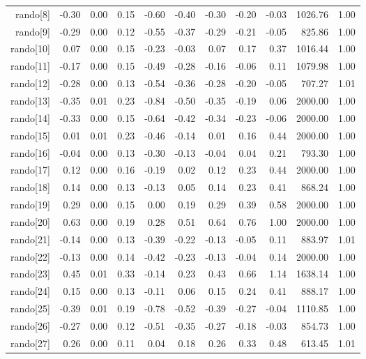 \begin{table}[ht]
\begin{tabular}{rrrrrrrrrrr}
  rando[8] & -0.30 & 0.00 & 0.15 & -0.60 & -0.40 & -0.30 & -0.20 & -0.03 & 1026.76 & 1.00 \\ 
  rando[9] & -0.29 & 0.00 & 0.12 & -0.55 & -0.37 & -0.29 & -0.21 & -0.05 & 825.86 & 1.00 \\ 
  rando[10] & 0.07 & 0.00 & 0.15 & -0.23 & -0.03 & 0.07 & 0.17 & 0.37 & 1016.44 & 1.00 \\ 
  rando[11] & -0.17 & 0.00 & 0.15 & -0.49 & -0.28 & -0.16 & -0.06 & 0.11 & 1079.98 & 1.00 \\ 
  rando[12] & -0.28 & 0.00 & 0.13 & -0.54 & -0.36 & -0.28 & -0.20 & -0.05 & 707.27 & 1.01 \\ 
  rando[13] & -0.35 & 0.01 & 0.23 & -0.84 & -0.50 & -0.35 & -0.19 & 0.06 & 2000.00 & 1.00 \\ 
  rando[14] & -0.33 & 0.00 & 0.15 & -0.64 & -0.42 & -0.34 & -0.23 & -0.06 & 2000.00 & 1.00 \\ 
  rando[15] & 0.01 & 0.01 & 0.23 & -0.46 & -0.14 & 0.01 & 0.16 & 0.44 & 2000.00 & 1.00 \\ 
  rando[16] & -0.04 & 0.00 & 0.13 & -0.30 & -0.13 & -0.04 & 0.04 & 0.21 & 793.30 & 1.00 \\ 
  rando[17] & 0.12 & 0.00 & 0.16 & -0.19 & 0.02 & 0.12 & 0.23 & 0.44 & 2000.00 & 1.00 \\ 
  rando[18] & 0.14 & 0.00 & 0.13 & -0.13 & 0.05 & 0.14 & 0.23 & 0.41 & 868.24 & 1.00 \\ 
  rando[19] & 0.29 & 0.00 & 0.15 & 0.00 & 0.19 & 0.29 & 0.39 & 0.58 & 2000.00 & 1.00 \\ 
  rando[20] & 0.63 & 0.00 & 0.19 & 0.28 & 0.51 & 0.64 & 0.76 & 1.00 & 2000.00 & 1.00 \\ 
  rando[21] & -0.14 & 0.00 & 0.13 & -0.39 & -0.22 & -0.13 & -0.05 & 0.11 & 883.97 & 1.01 \\ 
  rando[22] & -0.13 & 0.00 & 0.14 & -0.42 & -0.23 & -0.13 & -0.04 & 0.14 & 2000.00 & 1.00 \\ 
  rando[23] & 0.45 & 0.01 & 0.33 & -0.14 & 0.23 & 0.43 & 0.66 & 1.14 & 1638.14 & 1.00 \\ 
  rando[24] & 0.15 & 0.00 & 0.13 & -0.11 & 0.06 & 0.15 & 0.24 & 0.41 & 888.17 & 1.00 \\ 
  rando[25] & -0.39 & 0.01 & 0.19 & -0.78 & -0.52 & -0.39 & -0.27 & -0.04 & 1110.85 & 1.00 \\ 
  rando[26] & -0.27 & 0.00 & 0.12 & -0.51 & -0.35 & -0.27 & -0.18 & -0.03 & 854.73 & 1.00 \\ 
  rando[27] & 0.26 & 0.00 & 0.11 & 0.04 & 0.18 & 0.26 & 0.33 & 0.48 & 613.45 & 1.01 \\ 

\end{tabular}
\end{table}
